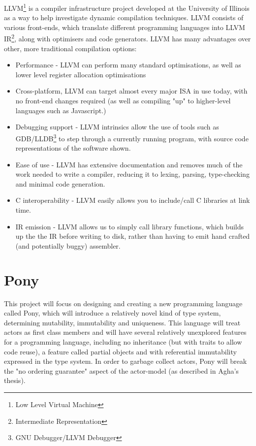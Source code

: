 \documentclass[11pt,a4paper]{report}
\begin{document}
LLVM\footnote{Low Level Virtual Machine} is a compiler infrastructure project developed at the University of Illinois as a way to help investigate dynamic compilation techniques\cite{Lattner:MSThesis02}.
LLVM consists of various front-ends, which translate different programming languages into LLVM IR\footnote{Intermediate Representation}, along with optimisers and code generators.
LLVM has many advantages over other, more traditional compilation options:
\begin{itemize}[noitemsep]
	\item Performance - LLVM can perform many standard optimisations, as well as lower level register allocation optimisations
	\item Cross-platform, LLVM can target almost every major ISA in use today\cite{llvm-svn}, with no front-end changes required (as well as compiling "up" to higher-level languages such as Javascript.)
	\item Debugging support - LLVM intrinsics allow the use of tools such as GDB/LLDB\footnote{GNU Debugger/LLVM Debugger} to step through a currently running program, with source code representations of the software shown.
	\item Ease of use - LLVM has extensive documentation and removes much of the work needed to write a compiler, reducing it to lexing, parsing, type-checking and minimal code generation.
	\item C interoperability - LLVM easily allows you to include/call C libraries at link time.
	\item IR emission - LLVM allows us to simply call library functions, which builds up the the IR before writing to disk, rather than having to emit hand crafted (and potentially buggy) assembler\cite{ibm-llvm}.
\end{itemize}

\newpage
\chapter{Pony}
\label{chapter:pony}

This project will focus on designing and creating a new programming language called Pony, which will introduce a relatively novel kind of type system, determining mutability, immutability and uniqueness.
This language will treat actors as first class members and will have several relatively unexplored features for a programming language, including no inheritance (but with traits to allow code reuse), a feature called partial objects and with referential immutability expressed in the type system.
In order to garbage collect actors, Pony will break the "no ordering guarantee" aspect of the actor-model (as described in Agha's thesis\cite{agha1985}).
\end{document}
